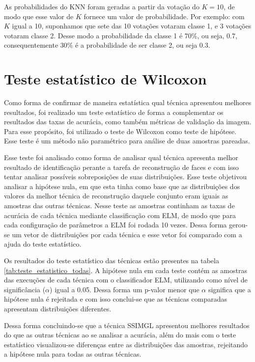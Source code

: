 	
As probabilidades do KNN foram geradas a partir da votação do $K=10$, de modo que esse valor de $K$ fornece  um valor de probabilidade. Por exemplo: com $K$ igual a 10, suponhamos que sete das 10 votações votaram classe 1, e 3 votações votaram classe 2. Desse modo a probabilidade da classe 1 é 70\%, ou seja, 0.7, consequentemente 30\% é a probabilidade de ser classe 2, ou seja 0.3.


\section{Teste estatístico de Wilcoxon}
Como forma de confirmar de maneira estatística qual técnica  apresentou melhores resultados, foi realizado um teste estatístico de forma a complementar os resultados das taxas de acurácia, como também métricas de validação da imagem. Para esse propósito, foi utilizado o teste de Wilcoxon \cite{litchfield1949simplified} como teste de hipótese. Esse teste é um método não paramétrico para análise de duas amostras pareadas.

Esse teste foi analisado como forma de  analisar qual técnica apresenta melhor resultado de identificação perante a tarefa de reconstrução de faces e com isso tentar analisar possíveis sobreposições de suas distribuições. Esse teste objetivou analisar a hipótese nula, em que esta tinha como base que as distribuições dos valores da melhor técnica de reconstrução daquele conjunto eram iguais as amostras das outras técnicas. Nesse teste as amostras continham as taxas de acurácia de cada técnica mediante classificação com ELM, de modo que para cada configuração de parâmetros a ELM foi rodada 10 vezes. Dessa forma gerou-se um vetor de distribuições por cada técnica e esse vetor foi comparado com a ajuda do teste estatístico.

Os resultados do teste estatístico das técnicas estão presentes na tabela \ref{tab:teste_estatistico_todas}. A hipótese nula em cada teste contém as amostras das execuções de cada técnica com o classificador ELM, utilizando como nível de significância ($\alpha$) igual a 0.05. Dessa forma um p-valor menor que  $\alpha$
significa que a hipótese nula é rejeitada e com isso conclui-se que as técnicas comparadas apresentam distribuições diferentes.

Dessa forma concluindo-se que a técnica SSIMGL apresentou melhores resultados do que as outras técnicas ao se analisar a acurácia, além do mais com o teste estatístico visualizou-se diferenças entre as distribuições das amostras, rejeitando a hipótese nula para todas as outras técnicas.


